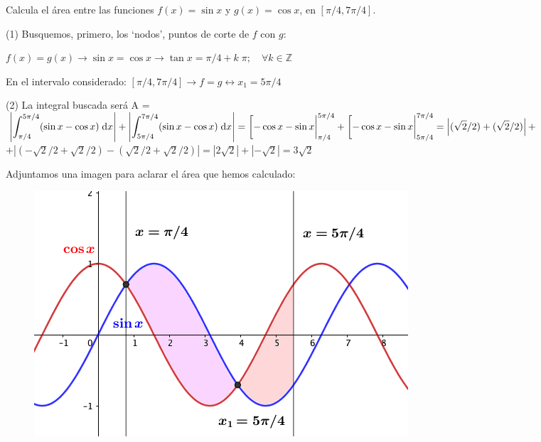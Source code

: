 \begin{ejem}
Calcula el área entre las funciones $f(x)=\sin x$ y $g(x)=\cos x$, en $[\pi/4, 7\pi/4]$.	


(1) Busquemos, primero, los `nodos', puntos de corte de $f$ con $g$:

$f(x)=g(x)\to \sin x = \cos x \to \tan x= \pi/4+k\;\pi; \quad \forall k\in \mathbb Z$

En el intervalo considerado: $[\pi/4, 7\pi/4] \to f=g \leftrightarrow x_1=5\pi/4   $

(2) La integral buscada será A = $\displaystyle \left| \int_{\pi/4}^{5\pi/4} (\sin x - \cos x)\; \dd x  \right| +  \left| \int_{5\pi/4}^{7\pi/4} (\sin x - \cos x)\; \dd x  \right|  = \eval[-\cos x - \sin x|_{\pi/4}^{5\pi/4}+ \eval[-\cos x - \sin x|_{5\pi/4}^{7\pi/4}=
\left| (\sqrt{2}/2)+(\sqrt{2}/2) \right| +$$+ \left| (-\sqrt{2}/2+\sqrt{2}/2)-(\sqrt{2}/2+\sqrt{2}/2) \right|=
|2\sqrt{2}|+|-\sqrt{2}|=3\sqrt{2} $

Adjuntamos una imagen para aclarar el área que hemos calculado:
\begin{figure}[H]
 		\centering
		\includegraphics[width=.8
		\textwidth]{imagenes/imagenes08/T08IM16.png}
	\end{figure}

\end{ejem}

